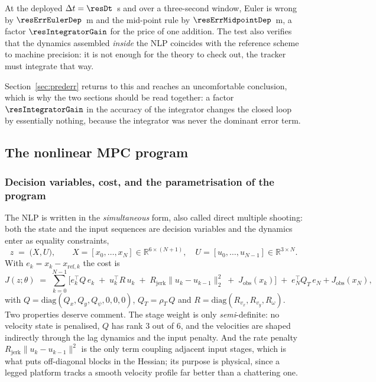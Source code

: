 \documentclass[11pt,a4paper]{article}
\newcommand{\R}{\mathbb{R}}
\newcommand{\Jobs}{J_{\mathrm{obs}}}
\newcommand{\Rjerk}{R_{\mathrm{jerk}}}
\begin{document}
\begin{table}[htbp]
  \centering
  \small
  \caption{Fitted global truncation order of the two integrators, by motion regime (log--log fit of the global error against the step size, on a constant-velocity arc whose exact solution is known).}
  \label{res:tab:order}
\end{table}

At the deployed $\Delta t=\resDt$~s and over a three-second window, Euler is wrong by
$\resErrEulerDep$~m and the mid-point rule by $\resErrMidpointDep$~m, a factor $\resIntegratorGain$ for the
price of one addition. The test also verifies that the dynamics assembled \emph{inside} the NLP coincides
with the reference scheme to machine precision: it is not enough for the theory to check out, the tracker
must integrate that way.

Section~\ref{sec:prederr} returns to this and reaches an uncomfortable conclusion, which is why the two
sections should be read together: a factor $\resIntegratorGain$ in the accuracy of the integrator changes the
closed loop by essentially nothing, because the integrator was never the dominant error term.

\subsection{The nonlinear MPC program}
\label{sec:nlp}

\subsubsection{Decision variables, cost, and the parametrisation of the program}
\label{sec:shoot}

The NLP is written in the \emph{simultaneous} form, also called direct multiple shooting: both the state and
the input sequences are decision variables and the dynamics enter as equality constraints,
\begin{equation}
  z \;=\; \big(X,U\big),\qquad X=[x_0,\dots,x_N]\in\R^{6\times(N+1)},\quad U=[u_0,\dots,u_{N-1}]\in\R^{3\times N}.
\end{equation}
With $e_k=x_k-x_{\mathrm{ref},k}$ the cost is
\begin{equation}
  J(z;\theta) \;=\;
  \sum_{k=0}^{N-1}\Big[e_k^{\!\top} Q\, e_k
  \;+\; u_k^{\!\top} R\, u_k
  \;+\; \Rjerk\|u_k-u_{k-1}\|_2^2
  \;+\; \Jobs(x_k)\Big]
  \;+\;e_N^{\!\top} Q_T\, e_N + \Jobs(x_N),
  \label{eq:cost}
\end{equation}
with $Q=\mathrm{diag}(Q_x,Q_y,Q_\psi,0,0,0)$, $Q_T=\rho_T\,Q$ and $R=\mathrm{diag}(R_{v_x},R_{v_y},R_\omega)$.
Two properties deserve comment. The stage weight is only \emph{semi}-definite: no velocity state is
penalised, $Q$ has rank $3$ out of $6$, and the velocities are shaped indirectly through the lag dynamics and
the input penalty. And the rate penalty $\Rjerk\|u_k-u_{k-1}\|^2$ is the only term coupling adjacent input
stages, which is what puts off-diagonal blocks in the Hessian; its purpose is physical, since a legged
platform tracks a smooth velocity profile far better than a chattering one.
\end{document}
